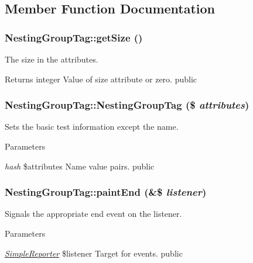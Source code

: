 \subsection{Member Function Documentation}
\hypertarget{class_nesting_group_tag_a513da334c0a3d682b0c773f9e69ae74a}{
\subsubsection[{getSize}]{\setlength{\rightskip}{0pt plus 5cm}NestingGroupTag::getSize ()}}
\label{class_nesting_group_tag_a513da334c0a3d682b0c773f9e69ae74a}
The size in the attributes. \begin{DoxyReturn}{Returns}
integer Value of size attribute or zero.  public 
\end{DoxyReturn}
\hypertarget{class_nesting_group_tag_aa5a5531ce68090e860bb469eb65a246b}{
\subsubsection[{NestingGroupTag}]{\setlength{\rightskip}{0pt plus 5cm}NestingGroupTag::NestingGroupTag (\$ {\em attributes})}}
\label{class_nesting_group_tag_aa5a5531ce68090e860bb469eb65a246b}
Sets the basic test information except the name. 
\begin{DoxyParams}{Parameters}
\item[{\em hash}]\$attributes Name value pairs.  public \end{DoxyParams}
\hypertarget{class_nesting_group_tag_a0800987bc9577f2460a502dc0becd692}{
\subsubsection[{paintEnd}]{\setlength{\rightskip}{0pt plus 5cm}NestingGroupTag::paintEnd (\&\$ {\em listener})}}
\label{class_nesting_group_tag_a0800987bc9577f2460a502dc0becd692}
Signals the appropriate end event on the listener. 
\begin{DoxyParams}{Parameters}
\item[{\em \hyperlink{class_simple_reporter}{SimpleReporter}}]\$listener Target for events.  public \end{DoxyParams}
